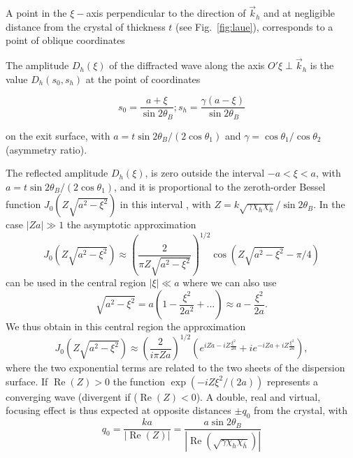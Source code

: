 \documentclass[preprint]{iucr}              %
\newcommand{\inred}[1]{{\color{red}#1}}
\begin{document}
A point in the $\xi-$axis perpendicular to the direction of $\vec k_h$ and at negligible distance from the crystal of thickness $t$ (see Fig.~\ref{fig:laue}), corresponds to a point of oblique coordinates 
\inred{
The amplitude $D_h(\xi)$ of the diffracted wave along the axis $O'\xi \perp \vec k_h$ is the value $D_h(s_0,s_h)$ at the point of coordinates 

\begin{equation}
    \label{eq:s0andsh}
    s_0 = \frac{a+\xi}{\sin2\theta_B }  ;  
    s_h = \frac{\gamma(a-\xi)}{\sin2\theta_B}
\end{equation}
}
on the exit surface, with $a=t \sin2\theta_B/(2\cos\theta_1)$ and $\gamma=\cos\theta_1/\cos\theta_2$ (asymmetry ratio). 



The reflected amplitude $D_h(\xi)$, is zero outside the interval $-a<\xi<a$, with $a=t \sin2\theta_B/(2 \cos\theta_1)$, and it is proportional to the zeroth-order Bessel function  $J_0(Z\sqrt{a^2-\xi^2})$ in this interval \cite{kato1961}, with  $Z=k\sqrt{\gamma\chi_h\chi_{\bar h}}/\sin2\theta_B$. In the case $|Z a| \gg 1$ the asymptotic approximation
\begin{equation}
    J_0(Z\sqrt{a^2-\xi^2})\approx \left(\frac{2}{\pi Z \sqrt{a^2-\xi^2}}\right)^{1/2} \cos(Z\sqrt{a^2-\xi^2}-\pi/4)
\end{equation}
can be used in the central region $|\xi|\ll a$ where we can also use
\begin{equation}
     \sqrt{a^2-\xi^2} = a (1-\frac{\xi^2}{2a^2}+...)\approx a - \frac{\xi^2}{2a}.
\end{equation}
We thus obtain in this central region the approximation
\begin{equation}
\label{eq:approximatedDiffractedField}
    J_0(Z\sqrt{a^2-\xi^2})\approx \left(\frac{2}{i \pi Z a}\right)^{1/2} \left( e^{iZa-i Z\frac{ \xi^2}{2a}} + i 
    e^{-i Z a+i Z\frac{\xi^2}{2a}} \right),
\end{equation}
where the two exponential terms are related to the two sheets of the dispersion surface. 
If $\operatorname{Re}(Z)>0$ the function $\exp(- i Z \xi^2 / (2 a))$ 
represents a converging wave (divergent if  ($\operatorname{Re}(Z)<0$). A double, real and virtual, focusing effect is thus expected at opposite distances $\pm q_0$ from the crystal, with
\begin{equation}
\label{eq:q0}
    q_0 = \frac{k a}{|\operatorname{Re}(Z)|}= \frac{a \sin2\theta_B}{|\operatorname{Re}(\sqrt{\gamma\chi_h\chi_{\bar h}})|}
\end{equation}
\end{document}
